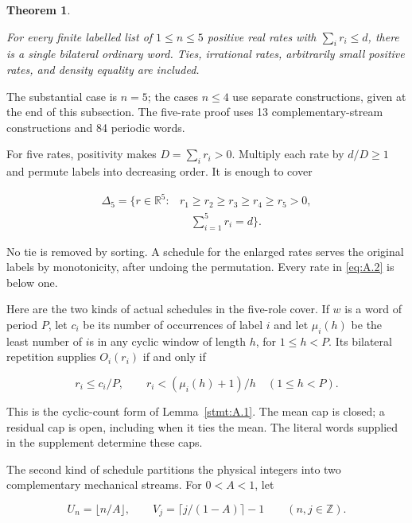 \documentclass[11pt,a4paper]{article}
\newtheorem{theorem}{Theorem}
\begin{document}
\begin{theorem}\label{stmt:A.5}

 For every finite labelled list of \(1\le n\le5\) positive real rates with \(\sum_i r_i\le d\), there is a single bilateral ordinary word. Ties, irrational rates, arbitrarily small positive rates, and density equality are included.

\end{theorem}

The substantial case is \(n=5\); the cases \(n\le4\) use separate constructions, given at the end of this subsection. The five-rate proof uses 13 complementary-stream constructions and 84 periodic words.

For five rates, positivity makes \(D=\sum_i r_i>0\). Multiply each rate by \(d/D\ge1\) and permute labels into decreasing order. It is enough to cover

\begin{equation}
\begin{aligned}
\Delta_5=\{r\in\mathbb R^5:
 &r_1\ge r_2\ge r_3\ge r_4\ge r_5>0,\\
 &\quad \sum_{i=1}^5r_i=d\}.
\end{aligned}
\tag{A.2}\label{eq:A.2}
\end{equation}

No tie is removed by sorting. A schedule for the enlarged rates serves the original labels by monotonicity, after undoing the permutation. Every rate in \eqref{eq:A.2} is below one.

Here are the two kinds of actual schedules in the five-role cover. If \(w\) is a word of period \(P\), let \(c_i\) be its number of occurrences of label \(i\) and let \(\mu_i(h)\) be the least number of \(i\)\textquotesingle s in any cyclic window of length \(h\), for \(1\le h<P\). Its bilateral repetition supplies \(O_i(r_i)\) if and only if

\begin{equation}
r_i\le c_i/P,\qquad r_i<(\mu_i(h)+1)/h\quad(1\le h<P).
\tag{A.3}\label{eq:A.3}
\end{equation}

This is the cyclic-count form of Lemma~\ref{stmt:A.1}. The mean cap is closed; a residual cap is open, including when it ties the mean. The literal words supplied in the supplement determine these caps.

The second kind of schedule partitions the physical integers into two complementary mechanical streams. For \(0<A<1\), let

\begin{equation}
U_n=\lfloor n/A\rfloor,\qquad
V_j=\lceil j/(1-A)\rceil-1\qquad(n,j\in\mathbb Z).
\tag{A.4}\label{eq:A.4}
\end{equation}
\end{document}
